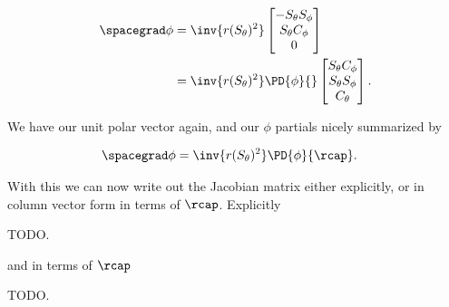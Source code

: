 \begin{align*}
\spacegrad \phi 
&=
\inv{r (S_\theta)^2}
\begin{bmatrix}
-S_\theta S_\phi \\
S_\theta C_\phi \\
0
\end{bmatrix} \\
&=
\inv{r (S_\theta)^2}
\PD{\phi}{}
\begin{bmatrix}
S_\theta C_\phi \\
S_\theta S_\phi \\
C_\theta
\end{bmatrix}.
\end{align*}

We have our unit polar vector again, and our $\phi$ partials nicely summarized by

\begin{align}\label{eqn:jacobianSphericalPolar:15}
\spacegrad \phi 
&=
\inv{r (S_\theta)^2}
\PD{\phi}{\rcap}.
\end{align}

With this we can now write out the Jacobian matrix either explicitly, or in column vector form in terms of $\rcap$.  Explicitly

TODO.

and in terms of $\rcap$

TODO.

\EndNoBibArticle
